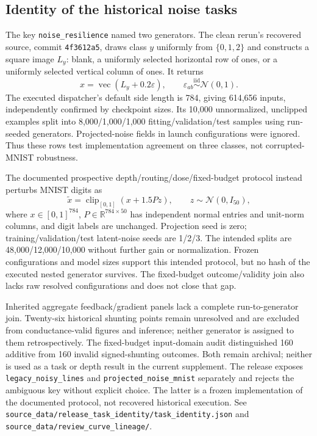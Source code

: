 \subsection{Identity of the historical noise tasks}

The key \texttt{noise\_resilience} named two generators. The clean rerun's recovered source, commit \texttt{4f3612a5}, draws class $y$ uniformly from $\{0,1,2\}$ and constructs a square image $L_y$: blank, a uniformly selected horizontal row of ones, or a uniformly selected vertical column of ones. It returns
\begin{equation}
x=\operatorname{vec}(L_y+0.2\varepsilon),\qquad
\varepsilon_{ab}\overset{\mathrm{iid}}{\sim}\mathcal N(0,1).
\label{eq:legacy_noisy_lines}
\end{equation}
The executed dispatcher's default side length is 784, giving 614,656 inputs, independently confirmed by checkpoint sizes. Its 10,000 unnormalized, unclipped examples split into 8,000/1,000/1,000 fitting/validation/test samples using run-seeded generators. Projected-noise fields in launch configurations were ignored. Thus these rows test implementation agreement on three classes, not corrupted-MNIST robustness.

The documented prospective depth/routing/dose/fixed-budget protocol instead perturbs MNIST digits as
\begin{equation}
\widetilde x=\operatorname{clip}_{[0,1]}(x+1.5Pz),\qquad z\sim\mathcal N(0,I_{50}),
\label{eq:projected_noise_mnist}
\end{equation}
where $x\in[0,1]^{784}$, $P\in\mathbb R^{784\times50}$ has independent normal entries and unit-norm columns, and digit labels are unchanged. Projection seed is zero; training/validation/test latent-noise seeds are 1/2/3. The intended splits are 48,000/12,000/10,000 without further gain or normalization. Frozen configurations and model sizes support this intended protocol, but no hash of the executed nested generator survives. The fixed-budget outcome/validity join also lacks raw resolved configurations and does not close that gap.

Inherited aggregate feedback/gradient panels lack a complete run-to-generator join. Twenty-six historical shunting points remain unresolved and are excluded from conductance-valid figures and inference; neither generator is assigned to them retrospectively. The fixed-budget input-domain audit distinguished 160 additive from 160 invalid signed-shunting outcomes. Both remain archival; neither is used as a task or depth result in the current supplement. The release exposes \texttt{legacy\_noisy\_lines} and \texttt{projected\_noise\_mnist} separately and rejects the ambiguous key without explicit choice. The latter is a frozen implementation of the documented protocol, not recovered historical execution. See \texttt{source\_data/release\_task\_identity/task\_identity.json} and \texttt{source\_data/review\_curve\_lineage/}.


